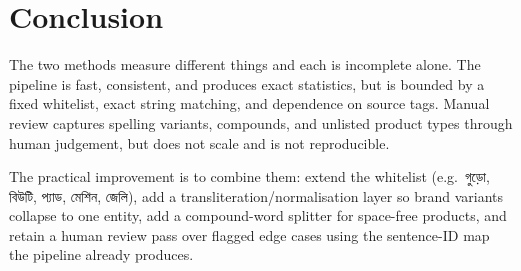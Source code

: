 \documentclass[11pt]{article}
\newcommand{\bn}[1]{{\bnfont #1}}
\begin{document}
\section{Conclusion}

The two methods measure different things and each is incomplete alone. The
pipeline is fast, consistent, and produces exact statistics, but is bounded by a
fixed whitelist, exact string matching, and dependence on source tags. Manual
review captures spelling variants, compounds, and unlisted product types through
human judgement, but does not scale and is not reproducible.

The practical improvement is to combine them: extend the whitelist (e.g.\
\bn{গুড়ো}, \bn{বিউটি}, \bn{প্যাড}, \bn{মেশিন}, \bn{জেলি}), add a
transliteration/normalisation layer so brand variants collapse to one entity,
add a compound-word splitter for space-free products, and retain a human review
pass over flagged edge cases using the sentence-ID map the pipeline already
produces.
\end{document}
